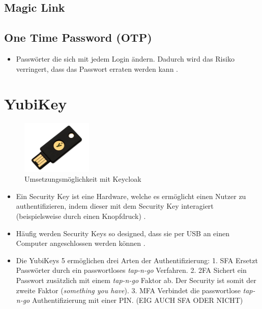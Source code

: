 \subsection{Magic Link}

\subsection{One Time Password (OTP)}
\begin{itemize}
    \item Passwörter die sich mit jedem Login ändern. Dadurch wird das Risiko verringert, dass das Passwort erraten werden kann \cite{boonkrong2012security}.
\end{itemize}

\section{YubiKey}

\begin{figure}[h]
	\centering 
	\includegraphics[width=0.3\textwidth]{img/abbildungen/yubikey.jpeg}
	\captionsetup{format=hang}
	\caption{Umsetzungsmöglichkeit mit Keycloak}
\end{figure}

 \begin{itemize}
    \item Ein Security Key ist eine Hardware, welche es ermöglicht einen Nutzer zu authentifizieren, indem dieser mit dem Security Key interagiert (beispielsweise durch einen Knopfdruck) \cite{reynolds2018tale}.
    \item Häufig werden Security Keys so designed, dass sie per USB an einen Computer angeschlossen werden können \cite{reynolds2018tale}.
    \item Die YubiKeys 5 ermöglichen drei Arten der Authentifizierung:
    1. \ac{SFA} Ersetzt Passwörter durch ein passwortloses \textit{tap-n-go} Verfahren.
    2. \ac{2FA} Sichert ein Passwort zusätzlich mit einem \textit{tap-n-go} Faktor ab. Der Security ist somit der zweite Faktor (\textit{something you have}).
    3. \ac{MFA} Verbindet die passwortlose \textit{tap-n-go} Authentifizierung mit einer PIN. (EIG AUCH SFA ODER NICHT)
 \end{itemize}

